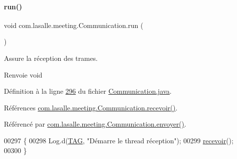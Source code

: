 \mbox{\label{classcom_1_1lasalle_1_1meeting_1_1_communication_afe29bde1b4538990bd0a8c9b2d512efa}} 
\paragraph{\texorpdfstring{run()}{run()}}
{\footnotesize\ttfamily void com.\+lasalle.\+meeting.\+Communication.\+run (\begin{DoxyParamCaption}{ }\end{DoxyParamCaption})}



Assure la réception des trames. 

\begin{DoxyReturn}{Renvoie}
void 
\end{DoxyReturn}


Définition à la ligne \hyperlink{_communication_8java_source_l00296}{296} du fichier \hyperlink{_communication_8java_source}{Communication.\+java}.



Références \hyperlink{_communication_8java_source_l00132}{com.\+lasalle.\+meeting.\+Communication.\+recevoir()}.



Référencé par \hyperlink{_communication_8java_source_l00090}{com.\+lasalle.\+meeting.\+Communication.\+envoyer()}.


\begin{DoxyCode}
00297     \{
00298         Log.d(\hyperlink{classcom_1_1lasalle_1_1meeting_1_1_communication_a5d58f88df1f20b4d61edbed9a82eccab}{TAG}, \textcolor{stringliteral}{"Démarre le thread réception"});
00299         \hyperlink{classcom_1_1lasalle_1_1meeting_1_1_communication_a0344b79faa04dded3468fb8dda6baa81}{recevoir}();
00300     \}
\end{DoxyCode}
\mbox{\label{classcom_1_1lasalle_1_1meeting_1_1_communication_af3090814ffb2fc9537961be52ebd17c2}} 
